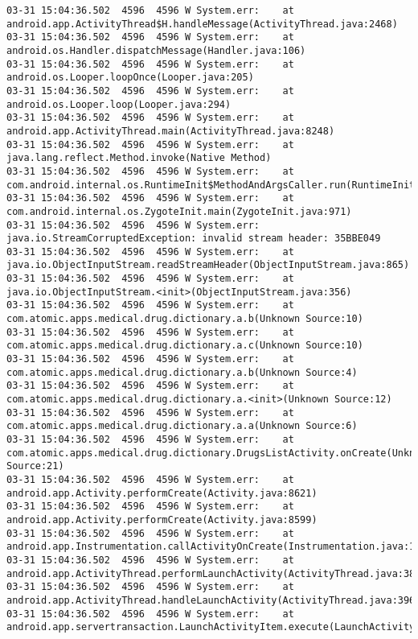 \begin{lstlisting}
03-31 15:04:36.502  4596  4596 W System.err: 	at android.app.ActivityThread$H.handleMessage(ActivityThread.java:2468)
03-31 15:04:36.502  4596  4596 W System.err: 	at android.os.Handler.dispatchMessage(Handler.java:106)
03-31 15:04:36.502  4596  4596 W System.err: 	at android.os.Looper.loopOnce(Looper.java:205)
03-31 15:04:36.502  4596  4596 W System.err: 	at android.os.Looper.loop(Looper.java:294)
03-31 15:04:36.502  4596  4596 W System.err: 	at android.app.ActivityThread.main(ActivityThread.java:8248)
03-31 15:04:36.502  4596  4596 W System.err: 	at java.lang.reflect.Method.invoke(Native Method)
03-31 15:04:36.502  4596  4596 W System.err: 	at com.android.internal.os.RuntimeInit$MethodAndArgsCaller.run(RuntimeInit.java:552)
03-31 15:04:36.502  4596  4596 W System.err: 	at com.android.internal.os.ZygoteInit.main(ZygoteInit.java:971)
03-31 15:04:36.502  4596  4596 W System.err: java.io.StreamCorruptedException: invalid stream header: 35BBE049
03-31 15:04:36.502  4596  4596 W System.err: 	at java.io.ObjectInputStream.readStreamHeader(ObjectInputStream.java:865)
03-31 15:04:36.502  4596  4596 W System.err: 	at java.io.ObjectInputStream.<init>(ObjectInputStream.java:356)
03-31 15:04:36.502  4596  4596 W System.err: 	at com.atomic.apps.medical.drug.dictionary.a.b(Unknown Source:10)
03-31 15:04:36.502  4596  4596 W System.err: 	at com.atomic.apps.medical.drug.dictionary.a.c(Unknown Source:10)
03-31 15:04:36.502  4596  4596 W System.err: 	at com.atomic.apps.medical.drug.dictionary.a.b(Unknown Source:4)
03-31 15:04:36.502  4596  4596 W System.err: 	at com.atomic.apps.medical.drug.dictionary.a.<init>(Unknown Source:12)
03-31 15:04:36.502  4596  4596 W System.err: 	at com.atomic.apps.medical.drug.dictionary.a.a(Unknown Source:6)
03-31 15:04:36.502  4596  4596 W System.err: 	at com.atomic.apps.medical.drug.dictionary.DrugsListActivity.onCreate(Unknown Source:21)
03-31 15:04:36.502  4596  4596 W System.err: 	at android.app.Activity.performCreate(Activity.java:8621)
03-31 15:04:36.502  4596  4596 W System.err: 	at android.app.Activity.performCreate(Activity.java:8599)
03-31 15:04:36.502  4596  4596 W System.err: 	at android.app.Instrumentation.callActivityOnCreate(Instrumentation.java:1456)
03-31 15:04:36.502  4596  4596 W System.err: 	at android.app.ActivityThread.performLaunchActivity(ActivityThread.java:3804)
03-31 15:04:36.502  4596  4596 W System.err: 	at android.app.ActivityThread.handleLaunchActivity(ActivityThread.java:3963)
03-31 15:04:36.502  4596  4596 W System.err: 	at android.app.servertransaction.LaunchActivityItem.execute(LaunchActivityItem.java:103)

\end{lstlisting}
